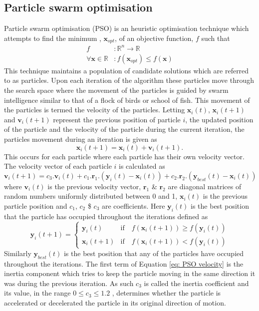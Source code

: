 \documentclass[12pt,oneside,openany,a4paper, %
english, %
masters-t, goldenblock]{usthesis}
\begin{document}
\subsection{Particle swarm optimisation}
Particle swarm optimisation (PSO) is an heuristic optimisation technique which attempts to find the minimum , $\bm{x}_{opt}$, of an objective function, $f$ such that
\begin{align}
  f&: \mathbb{R}^n \rightarrow \mathbb{R} \\
  \forall \bm{x} \in \mathbb{R} &: f(\bm{x}_{opt}) \leq f(\bm{x})
\end{align}
This technique maintains a population of candidate solutions which are referred to as particles. Upon each iteration of the algorithm these particles move through the search space where the movement of the particles is guided by swarm intelligence similar to that of a flock of birds or school of fish. This movement of the particles is termed the velocity of the particles. Letting $\bm{x}_i(t)$, $\bm{x}_i(t+1)$ and $\bm{v}_i(t+1)$ represent the previous position of particle $i$, the updated position of the particle and the velocity of the particle during the current iteration, the particles movement during an iteration is given as
\begin{equation}
\label{eq: PSO particles and velocities}
  \bm{x}_i(t+1) = \bm{x}_i(t) + \bm{v}_i(t+1).
\end{equation}
This occurs for each particle where each particle has their own velocity vector. The velocity vector of each particle $i$ is calculated as
\begin{equation}
\label{eq: PSO velocity}
  \bm{v}_i(t+1) = c_{3}.\bm{v}_i(t) + c_{1}.\bm{r}_1.(\bm{y}_i(t)-\bm{x}_i(t)) + c_2.\bm{r}_2.(\bm{y}_{best}(t) - \bm{x}_i(t))
\end{equation}
where $\bm{v}_i(t)$ is the previous velocity vector, $\bm{r}_1$ \& $\bm{r}_2$ are diagonal matrices of random numbers uniformly distributed between 0 and 1, $\bm{x}_i(t)$ is the previous particle position and $c_1$, $c_2$ \$ $c_3$ are coefficients. Here $\bm{y}_i(t)$ is the best position that the particle has occupied throughout the iterations defined as
\begin{equation}
 \bm{y}_i(t+1)=
 \begin{cases}
 \bm{y}_i(t) & \text{if} \quad f(\bm{x}_i(t+1)) \geq f(\bm{y}_i(t)) \\
 \bm{x}_i(t+1) & \text{if} \quad f(\bm{x}_i(t+1)) < f(\bm{y}_i(t))
 \end{cases} 
\end{equation}
Similarly $\bm{y}_{best}(t)$ is the best position that any of the particles have occupied throughout the iterations. The first term of Equation \ref{eq: PSO velocity} is the inertia component which tries to keep the particle moving in the same direction it was during the previous iteration. As such $c_3$ is called the inertia coefficient and its value, in the range $0 \leq c_3 \leq 1.2$ \cite{blondin2009particle}, determines whether the particle is accelerated or decelerated the particle in its original direction of motion.
\end{document}
